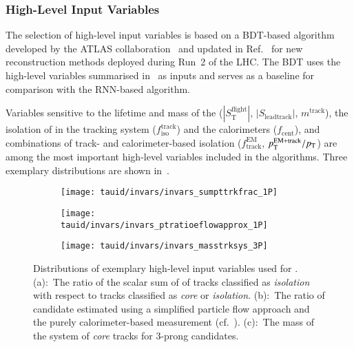 \subsubsection{High-Level Input Variables}

The selection of high-level input variables is based on a BDT-based
\tauid algorithm developed by the ATLAS
collaboration~\cite{ATL-PHYS-PUB-2015-045} and updated in
Ref.~\cite{cdeutsch-master} for new \tauhadvis reconstruction methods
deployed during Run~2 of the LHC. The BDT \tauid uses the high-level
variables summarised in~ as inputs and
serves as a baseline for comparison with the RNN-based algorithm.

Variables sensitive to the lifetime and mass of the \taulepton
($|S_{\text{T}}^{\text{flight}}|$, $|S_{\text{leadtrack}}|$,
$m^{\text{track}}$), the isolation of \tauhadvis in the tracking
system ($f_{\text{iso}}^{\text{track}}$) and the calorimeters
($f_{\text{cent}}$), and combinations of track- and calorimeter-based
isolation ($f_{\text{track}}^{\text{EM}}$,
$p_{\text{T}}^{\text{EM+track}} / p_{\text{T}}$) are among the most important
high-level variables included in the \tauid algorithms. Three
exemplary distributions are shown in~.


\begin{figure}[htbp]
  \centering

  \begin{subfigure}{0.33\textwidth}
    \texttt{[image: tauid/invars/invars\_sumpttrkfrac\_1P]}
    \subcaption{}
  \end{subfigure}\hfill%
  \begin{subfigure}{0.33\textwidth}
    \texttt{[image: tauid/invars/invars\_ptratioeflowapprox\_1P]}
    \subcaption{}
  \end{subfigure}\hfill%
  \begin{subfigure}{0.33\textwidth}
    \texttt{[image: tauid/invars/invars\_masstrksys\_3P]}
    \subcaption{}
  \end{subfigure}

  \caption{Distributions of exemplary high-level input variables used
    for \tauid. (a):~The ratio of the scalar sum of \pT of tracks
    classified as \emph{isolation} with respect to tracks classified
    as \emph{core} or \emph{isolation}. (b):~The ratio of \tauhadvis
    candidate \pT estimated using a simplified particle flow approach
    and the purely calorimeter-based measurement
    (cf.~). (c):~The mass of the
    system of \emph{core} tracks for 3-prong \tauhadvis candidates.}%
  \label{fig:tauid_high_level_vars}
\end{figure}


